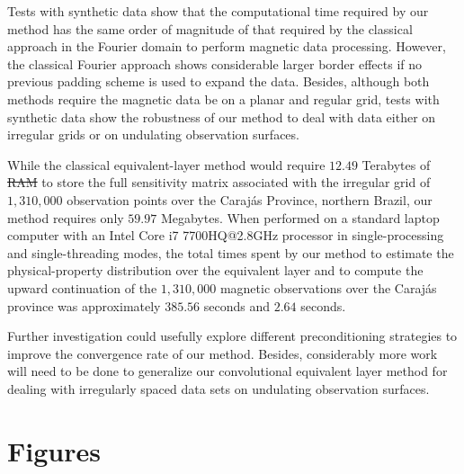 \documentclass[manuscript]{geophysics}
\providecommand{\DIFaddtex}[1]{{\protect\color{blue}\uwave{#1}}} %
\providecommand{\DIFdeltex}[1]{{\protect\color{red}\sout{#1}}}                      %
\providecommand{\DIFaddbegin}{} %
\providecommand{\DIFaddend}{} %
\providecommand{\DIFdelbegin}{} %
\providecommand{\DIFdelend}{} %
\providecommand{\DIFadd}[1]{\texorpdfstring{\DIFaddtex{#1}}{#1}} %
\providecommand{\DIFdel}[1]{\texorpdfstring{\DIFdeltex{#1}}{}} %
\begin{document}
Tests with synthetic data show that the computational time required by our method has 
the same order of magnitude of that required by the classical approach in the Fourier domain
to perform magnetic data processing.
However, the classical Fourier approach shows considerable larger border effects if no previous 
padding scheme is used to expand the data. 
Besides, although both methods require the magnetic data be on a planar and regular grid, 
tests with synthetic data show the robustness of our method to deal with data either on irregular grids
or on undulating observation surfaces.

While the classical equivalent-layer method would require $12.49$ Terabytes of \DIFdelbegin \DIFdel{RAM }\DIFdelend \DIFaddbegin \DIFadd{computer memory }\DIFaddend to store the full
sensitivity matrix associated with the irregular grid of $1,310,000$ observation points over the
Carajás Province, northern Brazil, our method requires only $59.97$ Megabytes.
When performed on a standard laptop computer with an Intel Core i7 7700HQ@2.8GHz processor in
single-processing and single-threading modes, the total times spent by our method to estimate the
physical-property distribution over the equivalent layer and to compute the upward continuation
of the $1,310,000$ magnetic observations over the Carajás province was approximately $385.56$ 
seconds and $2.64$ seconds.

Further investigation could usefully explore different preconditioning strategies to improve the
convergence rate of our method. Besides, considerably more work will need to be done to generalize
our convolutional equivalent layer method for dealing with irregularly spaced data sets on 
undulating observation surfaces.

\clearpage

\section{Figures}


\end{document}
